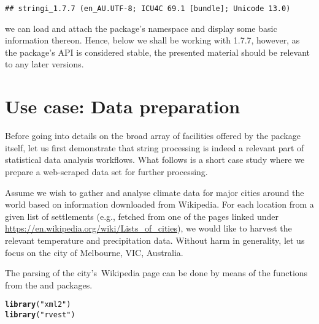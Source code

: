 \documentclass[nojss]{jss}\usepackage[]{graphicx}\usepackage[]{xcolor}
\makeatletter
\newcommand{\hlstr}[1]{\textcolor[rgb]{0.192,0.494,0.8}{#1}}%
\newcommand{\hlstd}[1]{\textcolor[rgb]{0.345,0.345,0.345}{#1}}%
\newcommand{\hlkwd}[1]{\textcolor[rgb]{0.737,0.353,0.396}{\textbf{#1}}}%
\newenvironment{kframe}{%
 \def\at@end@of@kframe{}%
 \ifinner\ifhmode%
  \def\at@end@of@kframe{\end{minipage}}%
  \begin{minipage}{\columnwidth}%
 \fi\fi%
 \def\FrameCommand##1{\hskip\@totalleftmargin \hskip-\fboxsep
 \colorbox{shadecolor}{##1}\hskip-\fboxsep
     \hskip-\linewidth \hskip-\@totalleftmargin \hskip\columnwidth}%
 \MakeFramed {\advance\hsize-\width
   \@totalleftmargin\z@ \linewidth\hsize
   \@setminipage}}%
 {\par\unskip\endMakeFramed%
 \at@end@of@kframe}
\newenvironment{knitrout}{}{} %
\makeatother
\begin{document}
\begin{knitrout}
\color{fgcolor}\begin{kframe}
\begin{verbatim}
## stringi_1.7.7 (en_AU.UTF-8; ICU4C 69.1 [bundle]; Unicode 13.0)
\end{verbatim}
\end{kframe}
\end{knitrout}


\noindent
we can load and attach the package's namespace
and display some basic information thereon.
Hence, below we shall be working with
 1.7.7, however, as the package's
API is considered stable, the presented material should be relevant to
any later versions.




\section{Use case: Data preparation}\label{Sec:examples}

Before going into details on the broad array of facilities offered by the
 package itself,
let us first demonstrate that string processing is indeed a relevant
part of statistical data analysis workflows.
What follows is a short case study where we prepare a web-scraped
data set for further processing.

Assume we wish to gather and analyse
climate data for major cities around the world based on information
downloaded from Wikipedia.
For each location from a given list of settlements (e.g.,
fetched from one of the pages linked under
\url{https://en.wikipedia.org/wiki/Lists_of_cities}),
we would like to harvest the relevant temperature and precipitation data.
Without harm in generality, let us focus on the city of Melbourne,
VIC, Australia.

The parsing of the city's~Wikipedia page
can be done by means of the functions from the
 \citep{xml2}
and  \citep{rvest} packages.

\begin{knitrout}
\color{fgcolor}\begin{kframe}
\begin{alltt}
\hlkwd{library}\hlstd{(}\hlstr{"xml2"}\hlstd{)}
\hlkwd{library}\hlstd{(}\hlstr{"rvest"}\hlstd{)}
\end{alltt}
\end{kframe}
\end{knitrout}
\end{document}
